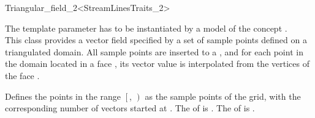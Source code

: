 

\begin{ccRefClass}{Triangular_field_2<StreamLinesTraits_2>}  %

\ccDefinition

The template parameter  has to be
instantiated by a model of the concept .\\

This class provides a vector field specified by a set of sample points
defined on a triangulated domain. All sample points are inserted to a
, and for each point  in the domain
located in a face , its vector value is interpolated from the
vertices of the face .

\ccCreation
{}  %


\ccThreeToTwo
{}
{		Defines the points in the range  
		$\left[\right.$, $\left.\right)$ 
		as the sample points of the grid, with the corresponding number of vectors started at .
\ccPrecond The  of  is .
\ccPrecond The  of  is .}

\ccIsModel 

 \\


\ccSeeAlso
{} \\
\end{ccRefClass}


